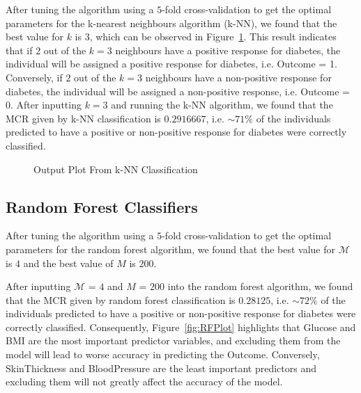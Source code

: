 \documentclass[12pt]{article}
\begin{document}
After tuning the algorithm using a $5$-fold cross-validation to get the optimal parameters for the k-nearest neighbours algorithm (k-NN), we found that the best value for $k$ is $3$, which can be observed in Figure~\ref{fig:KNNPlot}. This result indicates that if $2$ out of the $k = 3$ neighbours have a positive response for diabetes, the individual will be assigned a positive response for diabetes, i.e. Outcome = 1. Conversely, if $2$ out of the $k = 3$ neighbours have a non-positive response for diabetes, the individual will be assigned a non-positive response, i.e. Outcome = 0. After inputting $k=3$ and running the k-NN algorithm, we found that the MCR given by k-NN classification is $0.2916667$, i.e. $\sim71\%$ of the individuals predicted to have a positive or non-positive response for diabetes were correctly classified.

\begin{figure}[h!]
	\centering
	\caption{Output Plot From k-NN Classification} 
	\label{fig:KNNPlot}
\end{figure}

\subsection{Random Forest Classifiers}

\begin{indent}
	\onehalfspacing
	
After tuning the algorithm using a $5$-fold cross-validation to get the optimal parameters for the random forest algorithm, we found that the best value for $\mathcal{M}$ is $4$ and the best value of $M$ is $200$. 
	
After inputting $\mathcal{M}$ = $4$ and $M$ = $200$ into the random forest algorithm, we found that the MCR given by random forest classification is $0.28125$, i.e. $\sim72\%$ of the individuals predicted to have a positive or non-positive response for diabetes were correctly classified. Consequently, Figure~\ref{fig:RFPlot} highlights that Glucose and BMI are the most important predictor variables, and excluding them from the model will lead to worse accuracy in predicting the Outcome. Conversely, SkinThickness and BloodPressure are the least important predictors and excluding them will not greatly affect the accuracy of the model.
\end{indent}
\end{document}
